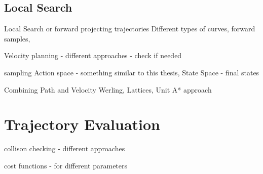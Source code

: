 \subsection{Local Search}
\label{rw_local_search}

Local Search or forward projecting trajectories
Different types of curves, 
forward samples, 

Velocity planning - different approaches - check if needed

sampling
Action space - something similar to this thesis, 
State Space - final states

Combining Path and Velocity Werling, Lattices, Unit A* approach








\section{Trajectory Evaluation}
\label{traj_eval}

collison checking - different approaches 

cost functions - for different parameters


